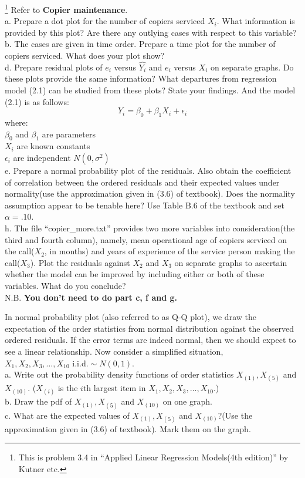 \documentclass[12pt]{article}
\begin{document}
 {\footnote[1]{This is
problem 3.4 in ``Applied Linear Regression Models(4th edition)'' by
Kutner etc.} 
 Refer to \textbf{Copier maintenance}.\\
 a. Prepare a dot plot for the number of copiers serviced $X_i$. What information is provided by this plot? Are there any outlying cases with respect to this variable?\\
 b. The cases are given in time order. Prepare a time plot for the number of copiers serviced. What does your plot show?\\
 d. Prepare residual plots of $e_i$ versus $\hat{Y_i}$ and $e_i$ versus $X_i$ on separate graphs. Do these plots provide the same information? What departures from regression model (2.1) can be studied from these plots? State your findings. And the model (2.1) is as follows:
 \[Y_i=\beta_0+\beta_1 X_i+\epsilon_i\]
 where:\\
 $\beta_0$ and $\beta_1$ are parameters\\
 $X_i$ are known constants\\
 $\epsilon_i$ are independent $N(0,\sigma^2)$\\

 e. Prepare a normal probability plot of the residuals. Also obtain the coefficient of correlation between the ordered residuals and their expected values under normality(use the approximation given in (3.6) of textbook). Does the normality assumption appear to be tenable here? Use Table B.6 of the textbook and set $\alpha=.10$.\\
 h. The file ``copier\_more.txt'' provides two more variables into consideration(the third and fourth column), namely, mean operational age of copiers serviced on the call($X_2$, in months) and years of experience of the service person making the call($X_3$). Plot the residuals against $X_2$ and $X_3$ on separate graphs to ascertain whether the model can be improved by including either or both of these variables. What do you conclude?\\
N.B. \textbf{You don't need to do part c, f and g.} 
}
 { \vfill
  \answer
} { }

 {
 In normal probability plot (also referred to as Q-Q plot), we draw the expectation
of the order statistics from normal distribution against the observed ordered residuals. If
the error terms are indeed normal, then we should expect to see a linear relationship. Now
consider a simplified situation, $X_1, X_2, X_{3},\ldots,X_{10} \text{ i.i.d.} \sim N(0,1)$.\\
 a. Write out the probability density functions of order statistics $X_{(1)}, X_{(5)} $ and $ X_{(10)}$. ($X_{(i)}$ is
the $i$th largest item in $X_1, X_2, X_{3},\ldots,X_{10} $.)\\
 b. Draw the pdf of $X_{(1)},X_{(5)} $ and $X_{(10)}$ on one graph.\\
 c. What are the expected values of $X_{(1)},X_{(5)} $ and $X_{(10)}$?(Use the approximation given in (3.6) of textbook).
Mark them on the graph.
}
 { \vfill
  \answer
} {}




\problemsdone
\end{document}
